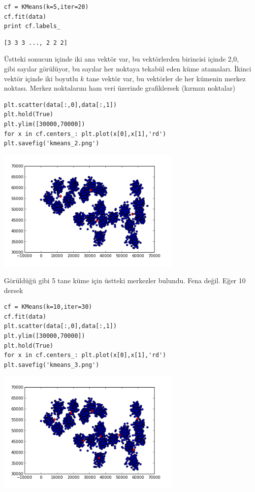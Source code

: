 \documentclass[12pt,fleqn]{article}\usepackage{../../common}
\begin{document}
\begin{verbatim}
cf = KMeans(k=5,iter=20)
cf.fit(data)
print cf.labels_
\end{verbatim}

\begin{verbatim}
[3 3 3 ..., 2 2 2]
\end{verbatim}

Üstteki sonucun içinde iki ana vektör var, bu vektörlerden birincisi içinde
2,0, gibi sayılar görülüyor, bu sayılar her noktaya tekabül eden küme
atamaları.  İkinci vektör içinde iki boyutlu $k$ tane vektör var, bu
vektörler de her kümenin merkez noktası. Merkez noktalarını ham veri
üzerinde grafiklersek (kırmızı noktalar)

\begin{verbatim}
plt.scatter(data[:,0],data[:,1])
plt.hold(True)
plt.ylim([30000,70000])
for x in cf.centers_: plt.plot(x[0],x[1],'rd')
plt.savefig('kmeans_2.png')
\end{verbatim}

\includegraphics[height=6cm]{kmeans_2.png}

Görüldüğü gibi 5 tane küme için üstteki merkezler bulundu. Fena
değil. Eğer 10 dersek

\begin{verbatim}
cf = KMeans(k=10,iter=30)
cf.fit(data)
plt.scatter(data[:,0],data[:,1])
plt.ylim([30000,70000])
plt.hold(True)
for x in cf.centers_: plt.plot(x[0],x[1],'rd')
plt.savefig('kmeans_3.png')
\end{verbatim}

\includegraphics[height=6cm]{kmeans_3.png}
\end{document}
